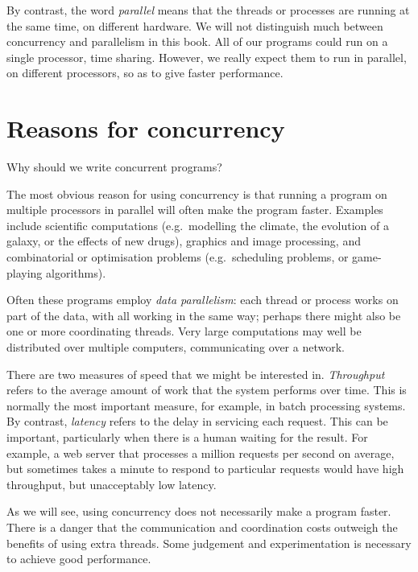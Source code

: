 By contrast, the word \emph{parallel} means that the threads or processes are
running at the same time, on different hardware.  We will not distinguish much
between concurrency and parallelism in this book.  All of our programs could
run on a single processor, time sharing.  However, we really expect them to
run in parallel, on different processors, so as to give faster performance.


\section{Reasons for concurrency}

Why should we write concurrent programs?

The most obvious reason for using concurrency is that running a program on
multiple processors in parallel will often make the program faster.  Examples
include scientific computations (e.g.~modelling the climate, the evolution of
a galaxy, or the effects of new drugs), graphics and image processing, and
combinatorial or optimisation problems (e.g.~scheduling problems, or
game-playing algorithms).  

Often these programs employ \emph{data parallelism}: each thread or process
works on part of the data, with all working in the same way; perhaps there
might also be one or more coordinating threads.  Very large computations may
well be distributed over multiple computers, communicating over a network.

There are two measures of speed that we might be interested in.
\emph{Throughput} refers to the average amount of work that the system
performs over time.  This is normally the most important measure, for example,
in batch processing systems.  By contrast, \emph{latency} refers to the delay
in servicing each request.  This can be important, particularly when there is
a human waiting for the result.  For example, a web server that processes
a million requests per second on average, but sometimes takes a minute to
respond to particular requests would have high throughput, but unacceptably
low latency.

As we will see, using concurrency does not necessarily make a program faster.
There is a danger that the communication and coordination costs outweigh the
benefits of using extra threads.  Some judgement and experimentation is
necessary to achieve good performance. 

